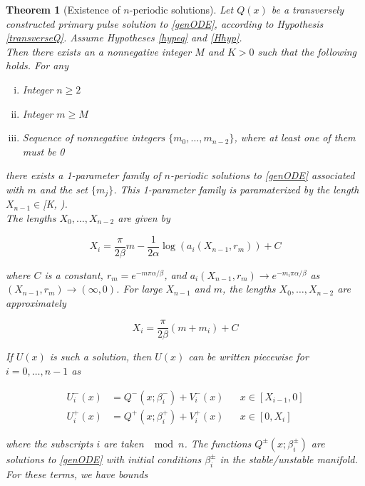 \documentclass[12pt]{article}
\newtheorem{theorem}{Theorem}
\begin{document}
\begin{theorem}[Existence of $n$-periodic solutions]\label{multiexist}
Let $Q(x)$ be a transversely constructed primary pulse solution to \eqref{genODE}, according to Hypothesis \ref{transverseQ}. Assume Hypotheses \ref{hypeq} and \ref{Hhyp}.\\

Then there exists an a nonnegative integer $M$ and $K > 0$ such that the following holds. For any 
\begin{enumerate}[(i)]
\item Integer $n \geq 2$ \\
\item Integer $m \geq M$ \\
\item Sequence of nonnegative integers $\{ m_0, \dots, m_{n-2} \}$, where at least one of them must be 0
\end{enumerate}

there exists a 1-parameter family of $n$-periodic solutions to \eqref{genODE} associated with $m$ and the set $\{ m_j \}$. This 1-parameter family is paramaterized by the length $X_{n-1} \in $[K, \infty).\\

The lengths $X_0, \dots, X_{n-2}$ are given by

\begin{equation}\label{Xi}
X_i = \frac{\pi}{2 \beta}m 
- \frac{1}{2 \alpha} \log(a_i(X_{n-1}, r_m)) + C
\end{equation}

where $C$ is a constant, $r_m = e^{-m \pi \alpha/\beta}$, and $a_i(X_{n-1}, r_m) \rightarrow e^{-m_i \pi \alpha/ \beta}$ as $(X_{n-1}, r_m) \rightarrow (\infty, 0)$. For large $X_{n-1}$ and $m$, the lengths $X_0, \dots, X_{n-2}$ are approximately

\begin{equation}\label{Xiapprox}
X_i = \frac{\pi}{2 \beta}(m + m_i) + C
\end{equation}

If $U(x)$ is such a solution, then $U(x)$ can be written piecewise for $i = 0, \dots, n-1$ as 

\begin{align}
U_i^-(x) &= Q^-(x; \beta_i^-) + V_i^-(x) && x \in [X_{i-1}, 0] \\
U_i^+(x) &= Q^+(x; \beta_i^+) + V_i^+(x) && x \in [0, X_i]
\end{align}

where the subscripts $i$ are taken $\mod n$. The functions $Q^\pm(x; \beta_i^\pm)$ are solutions to \eqref{genODE} with initial conditions $\beta_i^\pm$ in the stable/unstable manifold. For these terms, we have bounds


\end{theorem}
\end{document}
